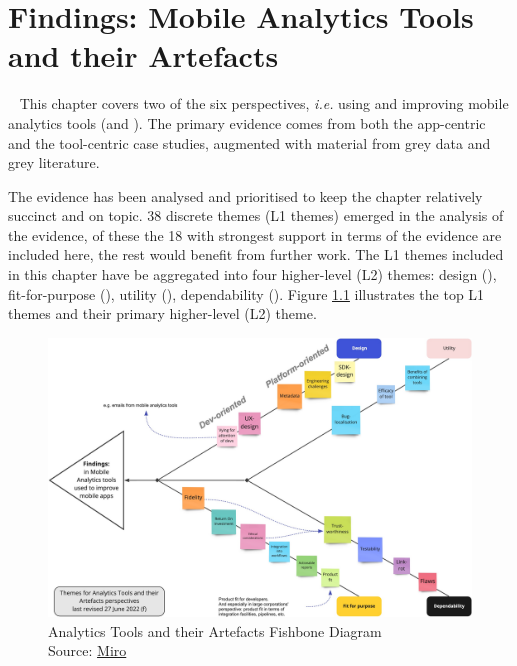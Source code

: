 \setchapterpreamble[u]{\margintoc}
\chapter{Findings: Mobile Analytics Tools and their Artefacts}~\label{chapter-tools-and-their-artefacts}
This chapter covers two of the six perspectives, \emph{i.e.} using and improving mobile analytics tools (\utools and \itools). The primary evidence comes from both the app-centric and the tool-centric case studies, augmented with material from grey data and grey literature.

The evidence has been analysed and prioritised to keep the chapter relatively succinct and on topic. 38 discrete themes (L1 themes) emerged in the analysis of the evidence, of these the 18 with strongest support in terms of the evidence are included here, the rest would benefit from further work. The L1 themes included in this chapter have be aggregated into four higher-level (L2) themes: design (), fit-for-purpose (), utility (), dependability (). Figure \ref{fig:analytics-tools-and-their-artefacts-fishbone-diagram} illustrates the top L1 themes and their primary higher-level (L2) theme.

\begin{figure}
    \centering
    \includegraphics[width=\linewidth]{images/rough-sketches/analytics-tools-and-their-artefacts-fishbone-diagram-27-jun-2022f.jpeg}
    \caption[Analytics Tools and their Artefacts Fishbone Diagram]{Analytics Tools and their Artefacts Fishbone Diagram\\Source: \href{https://miro.com/app/board/uXjVOtIsyWo=/?share_link_id=293061080490}{Miro}}
    \label{fig:analytics-tools-and-their-artefacts-fishbone-diagram}
\end{figure}

